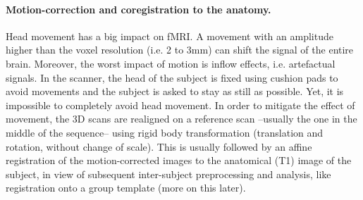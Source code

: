 \paragraph{Motion-correction and coregistration to the anatomy.}
Head movement has a big impact on fMRI. A movement
with an amplitude higher than the voxel resolution (i.e. 2 to 3mm) can
shift the signal of the entire brain. Moreover, the worst impact of motion is
inflow effects, i.e. artefactual signals. In the scanner, the head of the subject is
fixed using cushion pads to avoid movements and the subject is asked to stay
as still as possible. Yet, it is impossible to completely avoid head movement.
In order to mitigate the effect of movement, the 3D scans are realigned on a
reference scan --usually the one in the middle of the sequence-- using rigid
body transformation (translation and rotation, without change of scale).
This is usually followed by an affine registration of the motion-corrected images to
the anatomical (T1) image of the subject, in view of subsequent inter-subject preprocessing and analysis, like registration onto a group template (more on this later).

